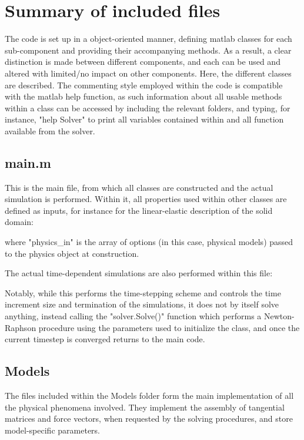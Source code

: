 \documentclass[3p]{elsarticle} %
\begin{document}
\section{Summary of included files}
The code is set up in a object-oriented manner, defining matlab classes for each sub-component and providing their accompanying methods. As a result, a clear distinction is made between different components, and each can be used and altered with limited/no impact on other components. Here, the different classes are described. The commenting style employed within the code is compatible with the matlab help function, as such information about all usable methods within a class can be accessed by including the relevant folders, and typing, for instance, "help Solver" to print all variables contained within and all function available from the solver. 

\subsection{main.m}
This is the main file, from which all classes are constructed and the actual simulation is performed. Within it, all properties used within other classes are defined as inputs, for instance for the linear-elastic description of the solid domain:

where "physics{\_}in" is the array of options (in this case, physical models) passed to the physics object at construction. 

The actual time-dependent simulations are also performed within this file:


Notably, while this performs the time-stepping scheme and controls the time increment size and termination of the simulations, it does not by itself solve anything, instead calling the "solver.Solve()" function which performs a Newton-Raphson procedure using the parameters used to initialize the class, and once the current timestep is converged returns to the main code.

\subsection{Models}
The files included within the Models folder form the main implementation of all the physical phenomena involved. They implement the assembly of tangential matrices and force vectors, when requested by the solving procedures, and store model-specific parameters. 
\end{document}
